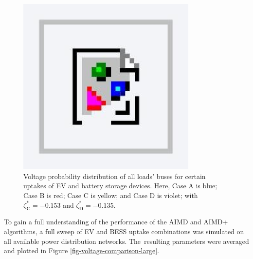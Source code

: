 \begin{figure}\centering
 \includegraphics[width=0.8\textwidth]{foo}
 \caption{Voltage probability distribution of all loads' buses for certain uptakes of EV and battery storage devices. Here, Case {A} is blue; Case {B} is red; Case {C} is yellow; and Case {D} is violet; with $\zeta_\textbf{C}^{*} = -0.153$ and $\zeta_\textbf{D}^{*}=-0.135$.}
 \label{fig-voltage-violation-excerpt}
\end{figure}

To gain a full understanding of the performance of the AIMD and AIMD+ algorithms, a full sweep of EV and BESS uptake combinations was simulated on all available power distribution networks. The~resulting parameters were averaged and plotted in Figure \ref{fig-voltage-comparison-large}.
\vspace{-12pt}


